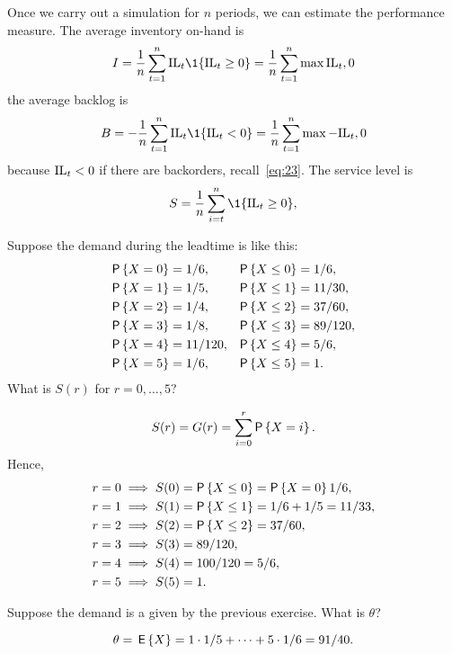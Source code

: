 Once we carry out a simulation for $n$ periods, we can estimate the
performance measure. The average  inventory on-hand is
\begin{equation}
  \label{eq:22}
  I = \frac 1n \sum_{t=1}^n \IL_t\1{\IL_t \geq 0} = \frac1n\sum_{t=1}^n \max{\IL_t, 0}
\end{equation}
the average backlog  is
\begin{equation}
  B = - \frac 1n \sum_{t=1}^n \IL_t\1{\IL_t < 0} = \frac1n\sum_{t=1}^n \max{-\IL_t, 0}
\end{equation}
because $\textrm{IL}_t<0$ if there are backorders, recall~\eqref{eq:23}. 
The service level is 
\begin{equation}
  \label{eq:22}
  S = \frac 1n \sum_{i=t}^n \1{\IL_t \geq 0},
\end{equation}

\begin{question}\label{q:basestock}
  Suppose the demand during the leadtime is like this:
  \begin{align*}
    \P{X = 0} &= 1/6, & \P{X \leq 0} &= 1/6,  \\
    \P{X = 1} &= 1/5, & \P{X \leq 1} &= 11/30,  \\
    \P{X = 2} &= 1/4, & \P{X \leq 2} &= 37/60, \\
    \P{X = 3} &= 1/8, & \P{X \leq 3} &= 89/120, \\
    \P{X = 4} &= 11/120, & \P{X \leq 4} &= 5/6, \\
    \P{X = 5} &= 1/6, & \P{X \leq 5} &= 1.
  \end{align*}
What is $S(r)$ for $r=0, \ldots, 5$?
\end{question}
\begin{solution}
  \begin{equation*}
    S(r) = G(r) = \sum_{i=0}^r \P{X = i}.
  \end{equation*}
Hence,
\begin{align*}
  r &= 0 \implies S(0) = \P{X \leq 0} = \P{X=0}1/6, \\
  r &= 1 \implies S(1) = \P{X \leq 1} = 1/6 + 1/5 = 11/33, \\
  r &= 2 \implies S(2) = \P{X \leq 2} = 37/60,\\
  r &= 3 \implies S(3) = 89/120, \\
  r &= 4 \implies S(4) = 100/120 = 5/6, \\
  r &= 5 \implies S(5) = 1.
\end{align*}
\end{solution}

\begin{question}\label{q:basestock_theta}
Suppose the demand is a given by the previous exercise. What is $\theta$?
\end{question}
\begin{solution}
  \begin{equation*}
    \theta = \,\mathsf{E}\left\{X\right\} =
1\cdot 1/5 + \cdots + 5 \cdot 1/6 = 91/40.
  \end{equation*}
\end{solution}

